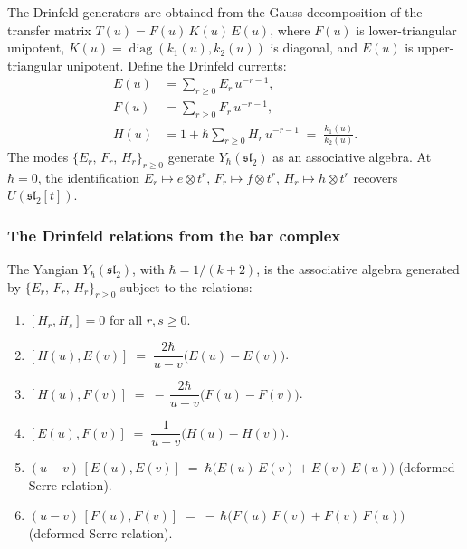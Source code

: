 The Drinfeld generators are obtained from the Gauss decomposition of the
transfer matrix $T(u) = F(u)\,K(u)\,E(u)$, where $F(u)$ is
lower-triangular unipotent, $K(u) = \operatorname{diag}(k_1(u),k_2(u))$
is diagonal, and $E(u)$ is upper-triangular unipotent. Define the
Drinfeld currents:
\begin{align}
\label{eq:drinfeld-E-current}
E(u) &= \sum_{r \ge 0} E_r\,u^{-r-1}, \\
\label{eq:drinfeld-F-current}
F(u) &= \sum_{r \ge 0} F_r\,u^{-r-1}, \\
\label{eq:drinfeld-H-current}
H(u) &= 1 + \hbar\sum_{r \ge 0} H_r\,u^{-r-1}
\;=\; \frac{k_1(u)}{k_2(u)}.
\end{align}
The modes $\{E_r,\,F_r,\,H_r\}_{r \ge 0}$ generate $Y_\hbar(\mathfrak{sl}_2)$
as an associative algebra. At $\hbar = 0$, the identification
$E_r \mapsto e \otimes t^r$, $F_r \mapsto f \otimes t^r$,
$H_r \mapsto h \otimes t^r$ recovers $U(\mathfrak{sl}_2[t])$.

\subsubsection*{The Drinfeld relations from the bar complex}

\begin{theorem}
\ClaimStatusProvedHere
\label{thm:drinfeld-yangian-sl2}
The Yangian $Y_\hbar(\mathfrak{sl}_2)$, with $\hbar = 1/(k+2)$, is the
associative algebra generated by $\{E_r,\,F_r,\,H_r\}_{r \ge 0}$ subject
to the relations:
\begin{enumerate}[label=\textup{(D\arabic*)},leftmargin=3.5em]
\item\label{app-drinfeld-sl2-D1} $[H_r, H_s] = 0$ for all $r,s \ge 0$.

\item\label{app-drinfeld-sl2-D2}
$[H(u), E(v)] \;=\; \dfrac{2\hbar}{u-v}\bigl(E(u) - E(v)\bigr)$.

\item\label{app-drinfeld-sl2-D3} $[H(u), F(v)] \;=\; -\,\dfrac{2\hbar}{u-v}\bigl(F(u) - F(v)\bigr)$.

\item\label{app-drinfeld-sl2-D4} $[E(u), F(v)] \;=\; \dfrac{1}{u-v}\bigl(H(u) - H(v)\bigr)$.

\item\label{app-drinfeld-sl2-D5} $(u{-}v)\,[E(u), E(v)]
\;=\; \hbar\bigl(E(u)\,E(v) + E(v)\,E(u)\bigr)$
\textup{(}deformed Serre relation\textup{)}.

\item\label{app-drinfeld-sl2-D6} $(u{-}v)\,[F(u), F(v)]
\;=\; -\,\hbar\bigl(F(u)\,F(v) + F(v)\,F(u)\bigr)$
\textup{(}deformed Serre relation\textup{)}.
\end{enumerate}
\end{theorem}

